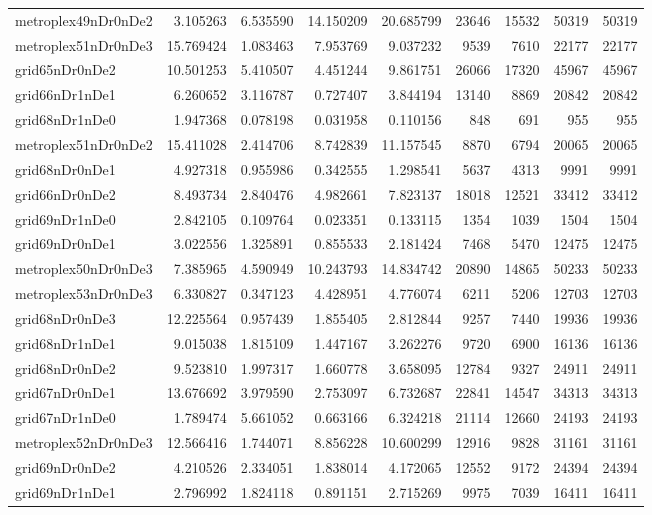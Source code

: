 \begin{longtable}{|l|r|r|r|r|r|r|r|r|}
metroplex49nDr0nDe2 & 3.105263 & 6.535590 & 14.150209 & 20.685799 & 23646 & 15532 & 50319 & 50319 \\
metroplex51nDr0nDe3 & 15.769424 & 1.083463 & 7.953769 & 9.037232 & 9539 & 7610 & 22177 & 22177 \\
grid65nDr0nDe2 & 10.501253 & 5.410507 & 4.451244 & 9.861751 & 26066 & 17320 & 45967 & 45967 \\
grid66nDr1nDe1 & 6.260652 & 3.116787 & 0.727407 & 3.844194 & 13140 & 8869 & 20842 & 20842 \\
grid68nDr1nDe0 & 1.947368 & 0.078198 & 0.031958 & 0.110156 & 848 & 691 & 955 & 955 \\
metroplex51nDr0nDe2 & 15.411028 & 2.414706 & 8.742839 & 11.157545 & 8870 & 6794 & 20065 & 20065 \\
grid68nDr0nDe1 & 4.927318 & 0.955986 & 0.342555 & 1.298541 & 5637 & 4313 & 9991 & 9991 \\
grid66nDr0nDe2 & 8.493734 & 2.840476 & 4.982661 & 7.823137 & 18018 & 12521 & 33412 & 33412 \\
grid69nDr1nDe0 & 2.842105 & 0.109764 & 0.023351 & 0.133115 & 1354 & 1039 & 1504 & 1504 \\
grid69nDr0nDe1 & 3.022556 & 1.325891 & 0.855533 & 2.181424 & 7468 & 5470 & 12475 & 12475 \\
metroplex50nDr0nDe3 & 7.385965 & 4.590949 & 10.243793 & 14.834742 & 20890 & 14865 & 50233 & 50233 \\
metroplex53nDr0nDe3 & 6.330827 & 0.347123 & 4.428951 & 4.776074 & 6211 & 5206 & 12703 & 12703 \\
grid68nDr0nDe3 & 12.225564 & 0.957439 & 1.855405 & 2.812844 & 9257 & 7440 & 19936 & 19936 \\
grid68nDr1nDe1 & 9.015038 & 1.815109 & 1.447167 & 3.262276 & 9720 & 6900 & 16136 & 16136 \\
grid68nDr0nDe2 & 9.523810 & 1.997317 & 1.660778 & 3.658095 & 12784 & 9327 & 24911 & 24911 \\
grid67nDr0nDe1 & 13.676692 & 3.979590 & 2.753097 & 6.732687 & 22841 & 14547 & 34313 & 34313 \\
grid67nDr1nDe0 & 1.789474 & 5.661052 & 0.663166 & 6.324218 & 21114 & 12660 & 24193 & 24193 \\
metroplex52nDr0nDe3 & 12.566416 & 1.744071 & 8.856228 & 10.600299 & 12916 & 9828 & 31161 & 31161 \\
grid69nDr0nDe2 & 4.210526 & 2.334051 & 1.838014 & 4.172065 & 12552 & 9172 & 24394 & 24394 \\
grid69nDr1nDe1 & 2.796992 & 1.824118 & 0.891151 & 2.715269 & 9975 & 7039 & 16411 & 16411 \\

\end{longtable}
